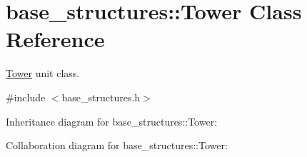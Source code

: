 \hypertarget{classbase__structures_1_1Tower}{}\section{base\+\_\+structures\+:\+:Tower Class Reference}
\label{classbase__structures_1_1Tower}


\hyperlink{classbase__structures_1_1Tower}{Tower} unit class.  




{\ttfamily \#include $<$base\+\_\+structures.\+h$>$}



Inheritance diagram for base\+\_\+structures\+:\+:Tower\+:


Collaboration diagram for base\+\_\+structures\+:\+:Tower\+:
